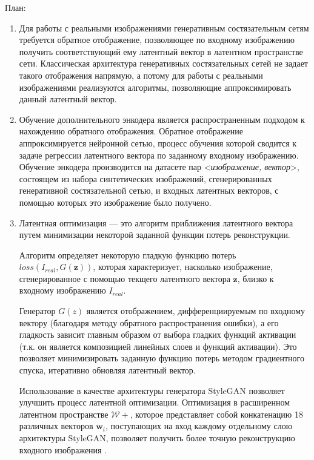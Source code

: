 План:
\begin{enumerate}
\item 
Для работы с реальными изображениями генеративным состязательным сетям требуется обратное отображение, позволяющее по входному изображению получить соответствующий ему латентный вектор в латентном пространстве сети. 
Классическая архитектура генеративных состязательных сетей не задает такого отображения напрямую, а потому для работы с реальными изображениями реализуются алгоритмы, позволяющие аппроксимировать данный латентный вектор.

\item 
Обучение дополнительного энкодера \cite{donahue2016adversarial} является распространенным подходом к нахождению обратного отображения.
Обратное отображение аппроксимируется нейронной сетью, процесс обучения которой сводится к задаче регрессии латентного вектора по заданному входному изображению. 
Обучение энкодера производится на датасете пар <\emph{изображение, вектор}>, состоящем из набора синтетических изображений, сгенерированных генеративной состязательной сетью, и входных латентных векторов, с помощью которых это изображение было получено.

\item
Латентная оптимизация \cite{perarnau2016invertible} --- это алгоритм приближения латентного вектора путем минимизации некоторой заданной функции потерь реконструкции.

Алгоритм определяет некоторую гладкую функцию потерь \linebreak $ loss(I_{real}, G(\mathbf z)) $, которая характеризует, насколько изображение, сгенерированное с помощью текщего латентного вектора $\mathbf z$, близко к входному изображению $I_{real}$.

Генератор $G(z)$ является отображением, дифференциируемым по входному вектору (благодаря методу обратного распространения ошибки), а его гладкость зависит главным образом от выбора гладких функций активации (т.к. он является композицией линейных слоев и функций активации). Это позволяет минимизировать заданную функцию потерь методом градиентного спуска, итеративно обновляя латентный вектор.

Использование в качестве архитектуры генератора StyleGAN позволяет улучшить процесс латентной оптимизации.
Оптимизация в расширенном латентном пространстве $\mathcal W+$, которое представляет собой конкатенацию 18 различных векторов $\mathbf w_i$, поступающих на вход каждому отдельному слою архитектуры StyleGAN, позволяет получить более точную реконструкцию входного изображения \cite{abdal2019image2stylegan}.

\end{enumerate}

